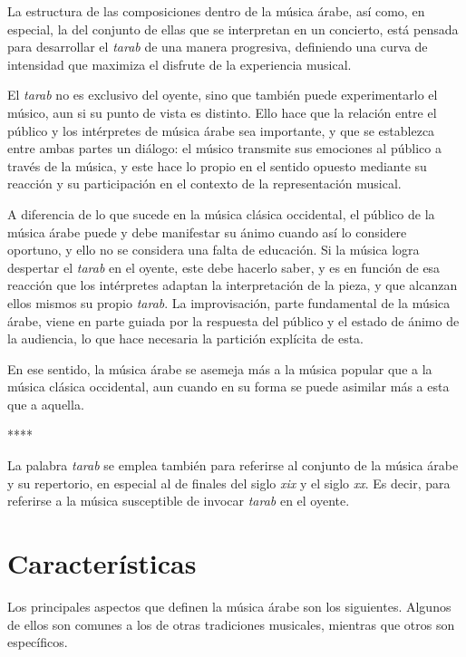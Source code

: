    La estructura de las composiciones dentro de la música árabe, así como, en especial, la del conjunto de ellas que se interpretan en un concierto, está pensada para desarrollar el \emph{tarab} de una manera progresiva, definiendo una curva de intensidad que maximiza el disfrute de la experiencia musical.

    El \emph{tarab} no es exclusivo del oyente, sino que también puede experimentarlo el músico, aun si su punto de vista es distinto. Ello hace que la relación entre el público y los intérpretes de música árabe sea importante, y que se establezca entre ambas partes un diálogo: el músico transmite sus emociones al público a través de la música, y este hace lo propio en el sentido opuesto mediante su reacción y su participación en el contexto de la representación musical.

    A diferencia de lo que sucede en la música clásica occidental, el público de la música árabe puede y debe manifestar su ánimo cuando así lo considere oportuno, y ello no se considera una falta de educación. Si la música logra despertar el \emph{tarab} en el oyente, este debe hacerlo saber, y es en función de esa reacción que los intérpretes adaptan la interpretación de la pieza, y que alcanzan ellos mismos su propio \emph{tarab}. La improvisación, parte fundamental de la música árabe, viene en parte guiada por  la respuesta del público y el estado de ánimo de la audiencia, lo que hace necesaria la partición explícita de esta.

    En ese sentido, la música árabe se asemeja más a la música popular que a la música clásica occidental, aun cuando en su forma se puede asimilar más a esta que a aquella.

    ****

    La palabra \emph{tarab} se emplea también para referirse al conjunto de la música árabe y su repertorio, en especial al de finales del siglo \emph{xix} y el siglo \emph{xx}. Es decir, para referirse a la música susceptible de invocar \emph{tarab} en el oyente.

    \section{Características}

    Los principales aspectos que definen la música árabe son los siguientes. Algunos de ellos son comunes a los de otras tradiciones musicales, mientras que otros son específicos.

